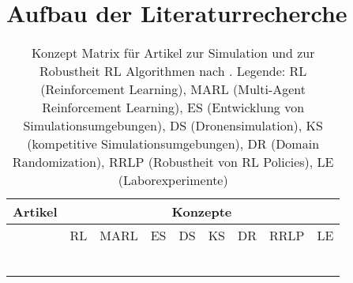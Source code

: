 \section{Aufbau der Literaturrecherche}
\begin{longtable}{|l|llllllll|}
    \hline
    \multicolumn{1}{|c|}{Artikel} & \multicolumn{8}{c|}{Konzepte}                                                                                                                                                                \\ \hline
    \endhead
                                  & \multicolumn{1}{l|}{RL} & \multicolumn{1}{l|}{MARL} & \multicolumn{1}{l|}{ES} & \multicolumn{1}{l|}{DS} & \multicolumn{1}{l|}{KS} & \multicolumn{1}{l|}{DR} & \multicolumn{1}{l|}{RRLP} & LE \\ \hline
                                  & \multicolumn{1}{l|}{}   & \multicolumn{1}{l|}{}     & \multicolumn{1}{l|}{}   & \multicolumn{1}{l|}{}   & \multicolumn{1}{l|}{}   & \multicolumn{1}{l|}{}   & \multicolumn{1}{l|}{}     &    \\ \hline
                                  & \multicolumn{1}{l|}{}   & \multicolumn{1}{l|}{}     & \multicolumn{1}{l|}{}   & \multicolumn{1}{l|}{}   & \multicolumn{1}{l|}{}   & \multicolumn{1}{l|}{}   & \multicolumn{1}{l|}{}     &    \\ \hline
                                  & \multicolumn{1}{l|}{}   & \multicolumn{1}{l|}{}     & \multicolumn{1}{l|}{}   & \multicolumn{1}{l|}{}   & \multicolumn{1}{l|}{}   & \multicolumn{1}{l|}{}   & \multicolumn{1}{l|}{}     &    \\ \hline
                                  & \multicolumn{1}{l|}{}   & \multicolumn{1}{l|}{}     & \multicolumn{1}{l|}{}   & \multicolumn{1}{l|}{}   & \multicolumn{1}{l|}{}   & \multicolumn{1}{l|}{}   & \multicolumn{1}{l|}{}     &    \\ \hline
                                  & \multicolumn{1}{l|}{}   & \multicolumn{1}{l|}{}     & \multicolumn{1}{l|}{}   & \multicolumn{1}{l|}{}   & \multicolumn{1}{l|}{}   & \multicolumn{1}{l|}{}   & \multicolumn{1}{l|}{}     &    \\ \hline
    \caption{Konzept Matrix für Artikel zur Simulation und zur Robustheit RL Algorithmen nach \cite[]{10.5555/2017160.2017162}.
    Legende: RL (Reinforcement Learning), MARL (Multi-Agent Reinforcement Learning), ES (Entwicklung von Simulationsumgebungen), DS (Dronensimulation), KS (kompetitive Simulationsumgebungen), DR (Domain Randomization), RRLP (Robustheit von RL Policies), LE (Laborexperimente)}
    \label{tab:research-table}\\
\end{longtable}